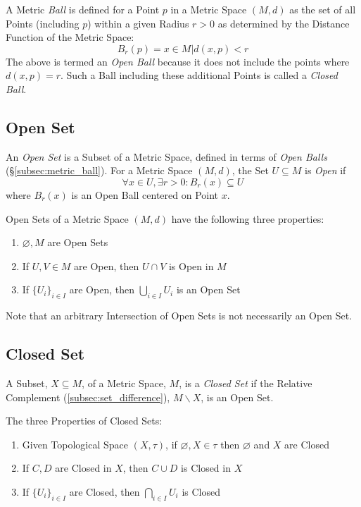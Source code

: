 \documentclass{article}
\begin{document}
A Metric \emph{Ball} is defined for a Point $p$ in a Metric Space
$(M,d)$ as the set of all Points (including $p$) within a given Radius
$r > 0$ as determined by the Distance Function of the Metric Space:
\[
    B_r(p) = {x \in M | d(x,p) < r }
\]
The above is termed an \emph{Open Ball} because it does not include
the points where $d(x,p) = r$. Such a Ball including these additional
Points is called a \emph{Closed Ball}.



\subsection{Open Set}\label{subsec:open_set}

An \emph{Open Set} is a Subset of a Metric Space, defined in terms of
\emph{Open Balls} (\S\ref{subsec:metric_ball}). For a Metric Space
$(M,d)$, the Set $U \subseteq M$ is \emph{Open} if
\[
    \forall x \in U, \exists r > 0 : B_r(x) \subseteq U
\]
where $B_r(x)$ is an Open Ball centered on Point $x$.

Open Sets of a Metric Space $(M,d)$ have the following three
properties:
\begin{enumerate}
\item $\varnothing, M$ are Open Sets
\item If $U, V \in M$ are Open, then $U \cap V$ is Open in $M$
\item If $\{ U_i \}_{i \in I}$ are Open, then $\bigcup_{i \in I}
  U_i$ is an Open Set
\end{enumerate}
Note that an arbitrary Intersection of Open Sets is not necessarily an
Open Set.



\subsection{Closed Set}\label{subsec:closed_set}

A Subset, $X \subseteq M$, of a Metric Space, $M$, is a \emph{Closed
  Set} if the Relative Complement (\ref{subsec:set_difference}), $M
\backslash X$, is an Open Set.

The three Properties of Closed Sets:
\begin{enumerate}
\item Given Topological Space $(X, \tau)$, if $\varnothing, X \in
  \tau$ then $\varnothing$ and $X$ are Closed
\item If $C, D$ are Closed in $X$, then $C \cup D$ is Closed in $X$
\item If $\{ U_i \}_{i \in I}$ are Closed, then $\bigcap_{i \in I}
  U_i$ is Closed
\end{enumerate}
\end{document}
